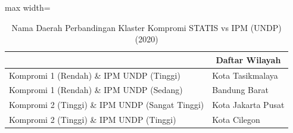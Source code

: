 \begin{table}[H]
\centering
\caption{Nama Daerah Perbandingan Klaster Kompromi STATIS vs IPM (UNDP) (2020)} \label{tab:sample2comp_ipm_name_2020}
\begin{adjustbox}{max width=\textwidth}
\begin{tabular}{|>{\centering\arraybackslash}p{4cm}|p{10cm}|}
\hline
\multicolumn{1}{|c|}{\textbf{Kategori}} & \multicolumn{1}{c|}{\textbf{Daftar Wilayah}} \\
\hline
Kompromi 1 (Rendah) \& IPM UNDP (Tinggi) & Kota Tasikmalaya \\
\hline
Kompromi 1 (Rendah) \& IPM UNDP (Sedang) & Bandung Barat \\
\hline
Kompromi 2 (Tinggi) \& IPM UNDP (Sangat Tinggi) & Kota Jakarta Pusat \\
\hline
Kompromi 2 (Tinggi) \& IPM UNDP (Tinggi) & Kota Cilegon \\
\hline
\end{tabular}
\end{adjustbox}
\end{table}